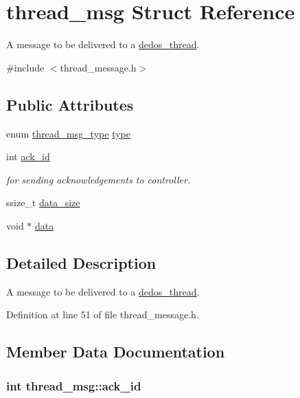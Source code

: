 \hypertarget{structthread__msg}{\section{thread\-\_\-msg Struct Reference}
\label{structthread__msg}
}


A message to be delivered to a \hyperlink{structdedos__thread}{dedos\-\_\-thread}.  




{\ttfamily \#include $<$thread\-\_\-message.\-h$>$}

\subsection*{Public Attributes}
\begin{DoxyCompactItemize}
\item 
enum \hyperlink{thread__message_8h_ae1d212e0fe0ba69bb058e9d25e286380}{thread\-\_\-msg\-\_\-type} \hyperlink{structthread__msg_a21b68a06c996049760fba8a1b148d215}{type}
\item 
int \hyperlink{structthread__msg_ad59749a939b0157e7e81445909ea8f3a}{ack\-\_\-id}
\begin{DoxyCompactList}\small\item\em for sending acknowledgements to controller. \end{DoxyCompactList}\item 
ssize\-\_\-t \hyperlink{structthread__msg_a7f32cae0c8abf93abf07be5fb141530f}{data\-\_\-size}
\item 
void $\ast$ \hyperlink{structthread__msg_adbe60c1c6c0aca2e83f5e3e5bedb1b18}{data}
\end{DoxyCompactItemize}


\subsection{Detailed Description}
A message to be delivered to a \hyperlink{structdedos__thread}{dedos\-\_\-thread}. 

Definition at line 51 of file thread\-\_\-message.\-h.



\subsection{Member Data Documentation}
\hypertarget{structthread__msg_ad59749a939b0157e7e81445909ea8f3a}{
\subsubsection[{ack\-\_\-id}]{\setlength{\rightskip}{0pt plus 5cm}int thread\-\_\-msg\-::ack\-\_\-id}}\label{structthread__msg_ad59749a939b0157e7e81445909ea8f3a}


